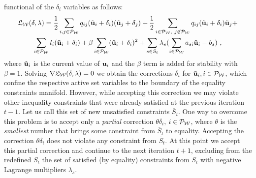 \documentclass[final]{siamltex}
\begin{document}
functional of the $\delta_i$ variables as follows:
\begin{multline}
\mathfrak{L}_{\mathcal{W}}(\delta, \lambda)= \frac{1}{2} \sum_{i,j\in
\bold{\mathcal{P}}_{\mathcal{W}}}q_{ij}(\tilde{{\bf u}}_i+\delta_i)(\tilde{{\bf u}}_j+ \delta_j) +
\frac{1}{2}\sum_{\substack{i\in \bold{\mathcal{P}}_{\mathcal{W}} ,~  j\not\in
\bold{\mathcal{P}}_{\mathcal{W}}}}q_{ij}(\tilde{{\bf u}}_i+\delta_i)\tilde{{\bf u}}_j +\\
\sum_{i\in \bold{\mathcal{P}}_{\mathcal{W}}}l_i(\tilde{{\bf u}}_i+\delta_i)  +
 \beta \sum_{i\in \bold{\mathcal{P}}_{\mathcal{W}}} (\tilde{{\bf u}}_{i}+\delta_i)^2 +
 \sum_{s\in  S_t}\lambda_s(\sum_{i\in \bold{\mathcal{P}}_{\mathcal{W}}}a_{si}\tilde{{\bf u}}_i-b_s)~,
\end{multline}
where $\tilde{{\bf u}}_i$ is the current value of ${\bf u}_i$ and the
$\beta$ term is added for stability with $\beta=1$. Solving
$\nabla \mathfrak{L}_{\mathcal{W}}(\delta,\lambda)=0$ we obtain the corrections
$\delta_i$ for $\tilde{{\bf u}}_i, i \in \bold{\mathcal{P}}_{\mathcal{W}}$, which confine the
respective active set variables to the boundary of the equality
constraints manifold. However, while accepting this correction we
may violate other inequality constraints that were already
satisfied at the previous iteration $t-1$. Let us call this set of
new unsatisfied constraints $\overline{S}_t$. One way to overcome
this problem is to accept only a {\it partial} correction $\theta
\delta_i$, $i\in \bold{\mathcal{P}}_{\mathcal{W}}$, where $\theta$ is the {\it smallest}
number that brings some constraint from $\overline{S}_t$ to
equality. Accepting the correction $\theta \delta_i$ does not
violate any constraint from $\overline{S}_t$. At this point we
accept this partial correction and continue to the next iteration
$t+1$, excluding from the redefined $S_t$ the set of satisfied (by
equality) constraints from $S_t$ with negative Lagrange
multipliers $\lambda_s$. \vspace{6mm}
\end{document}
